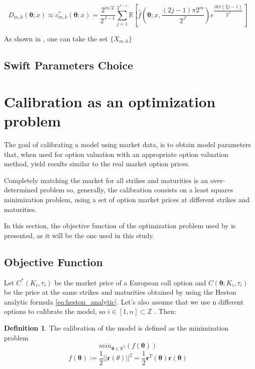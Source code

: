 \documentclass[12,twoside]{mammeTFM}
\theoremstyle{definition}
\newtheorem{definition}[thm]{Definition}
\theoremstyle{remark}
\newcommand{\Z}{\ensuremath{\mathbb{Z}}}
\newcommand{\R}{\ensuremath{\mathbb{R}}}
\begin{document}
\begin{equation}
D_{m,k}(\boldsymbol{\theta}; x) \approx c^*_{m,k} (\boldsymbol{\theta}; x) = \dfrac{2^{m/2}}{2^{J-1}} \sum_{j=1}^{2^{J-1}} \R \left[\hat{f}\left(\boldsymbol{\theta}; x, \dfrac{(2j - 1) \pi 2^m}{2^J}\right) e^{\dfrac{ik\pi(2j-1)}{2^J}}\right] 
\end{equation}

As shown in \cite{ort16}, one can take the set $\{X_{m,k}\}$

\subsection{Swift Parameters Choice}

\section{Calibration as an optimization problem} \label{chap:optimization_problem}
The goal of calibrating a model using market data, is to obtain model parameters that, when used for option valuation with an appropriate option valuation method, yield results similar to the real market option prices.

Completely matching the market for all strikes and maturities is an over-determined problem so, generally, the calibration consists on a least squares minimization problem, using a set of option market prices at different strikes and maturities.

In this section, the objective function of the optimization problem used by \cite{cui17} is presented, as it will be the one used in this study.

\subsection{Objective Function}
Let $C^*(K_i, \tau_i)$ be the market price of a European call option and
 $C(\boldsymbol{\theta}; K_i, \tau_i)$ be the price at the same strikes and maturities obtained by using the Heston analytic formula \ref{eq:heston_analytic}. Let's also assume that we use n different options to calibrate the model, so 
 $i \in [1,n] \subset \Z$
 . Then:
 \begin{definition} The calibration of the model is defined as the minimization problem $$min_{\boldsymbol{\theta} \in \R^5} (f(\boldsymbol{\theta}))$$ $$f(\boldsymbol{\theta}) := \dfrac{1}{2}||\boldsymbol{r}(\theta)||^2 = \dfrac{1}{2} \boldsymbol{r}^T(\boldsymbol{\theta})\boldsymbol{r}(\boldsymbol{\theta})$$
\end{definition}
\end{document}

